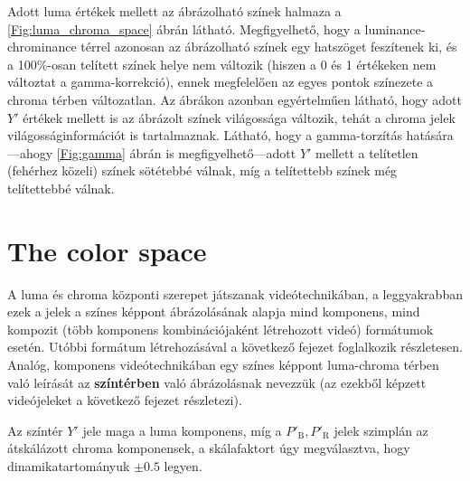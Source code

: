 Adott luma értékek mellett az ábrázolható színek halmaza a \ref{Fig:luma_chroma_space} ábrán látható.
Megfigyelhető, hogy a luminance-chrominance térrel azonosan az ábrázolható színek egy hatszöget feszítenek ki, és a 100\%-osan telített színek helye nem változik (hiszen a 0 és 1 értékeken nem változtat a gamma-korrekció), ennek megfelelően az egyes pontok színezete a chroma térben változatlan.
Az ábrákon azonban egyértelműen látható, hogy adott $Y'$ értékek mellett is az ábrázolt színek világossága változik, tehát a chroma jelek világosságinformációt is tartalmaznak.
Látható, hogy a gamma-torzítás hatására---ahogy \ref{Fig:gamma} ábrán is megfigyelhető---adott $Y'$ mellett a telítetlen (fehérhez közeli) színek sötétebbé válnak, míg a telítettebb színek még telítettebbé válnak. 


\section{The \ypbpr color space}

A luma és chroma központi szerepet játszanak videótechnikában, a leggyakrabban ezek a jelek a színes képpont ábrázolásának alapja mind komponens, mind kompozit (több komponens kombinációjaként létrehozott videó) formátumok esetén.
Utóbbi formátum létrehozásával a következő fejezet foglalkozik részletesen.
Analóg, komponens videótechnikában egy színes képpont luma-chroma térben való leírását az \textbf{\ypbpr színtérben} való ábrázolásnak nevezzük (az ezekből képzett \ypbpr videójeleket a következő fejezet részletezi).

Az \ypbpr színtér $Y'$ jele maga a luma komponens, míg a $P'_{\mathrm{B}}, P'_{\mathrm{R}}$ jelek szimplán az átskálázott chroma komponensek, a skálafaktort úgy megválasztva, hogy dinamikatartományuk $\pm 0.5$ legyen.

